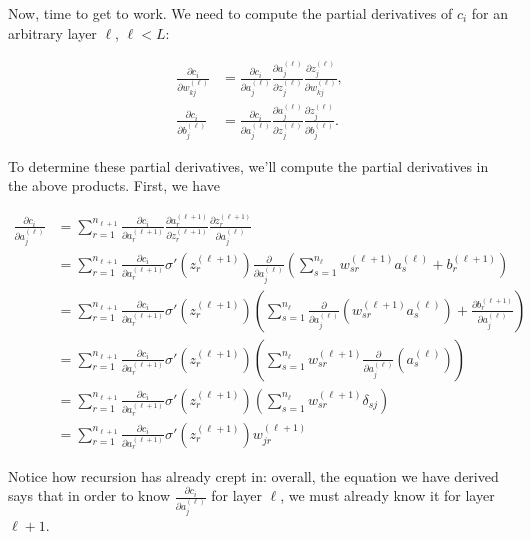\documentclass{article}
\begin{document}
	Now, time to get to work. We need to compute the partial derivatives of $c_i$ for an arbitrary layer $\ell$, $\ell < L$:
	
	\begin{align*}
		\frac{\partial c_i}{\partial w^{(\ell)}_{kj}} &= \frac{\partial c_i}{\partial a^{(\ell)}_j} \frac{\partial a^{(\ell)}_j}{\partial z^{(\ell)}_j} \frac{\partial z^{(\ell)}_j}{\partial w^{(\ell)}_{kj}}, \\
		\frac{\partial c_i}{\partial b^{(\ell)}_j} &= \frac{\partial c_i}{\partial a^{(\ell)}_j} \frac{\partial a^{(\ell)}_j}{\partial z^{(\ell)}_j} \frac{\partial z^{(\ell)}_j}{\partial b^{(\ell)}_j}.
	\end{align*}
	
	To determine these partial derivatives, we'll compute the partial derivatives in the above products. First, we have
	
	\begin{align*}
		\frac{\partial c_i}{\partial a^{(\ell)}_j} &= \sum_{r = 1}^{n_{\ell+1}} \frac{\partial c_i}{\partial a^{(\ell+1)}_r} \frac{\partial a^{(\ell+1)}_r}{\partial z^{(\ell + 1)}_r} \frac{\partial z^{(\ell + 1)}_r}{\partial a^{(\ell)}_j} \\
		&= \sum_{r = 1}^{n_{\ell+1}} \frac{\partial c_i}{\partial a^{(\ell+1)}_r} \sigma'(z^{(\ell + 1)}_r) \frac{\partial}{\partial a^{(\ell)}_j}\left(\sum_{s = 1}^{n_\ell} w^{(\ell + 1)}_{sr} a^{(\ell)}_s + b^{(\ell + 1)}_r\right) \\
		&= \sum_{r = 1}^{n_{\ell+1}} \frac{\partial c_i}{\partial a^{(\ell+1)}_r} \sigma'(z^{(\ell + 1)}_r) \left(\sum_{s = 1}^{n_\ell} \frac{\partial}{\partial a^{(\ell)}_j}\left(w^{(\ell + 1)}_{sr} a^{(\ell)}_s\right) + \frac{\partial b^{(\ell + 1)}_r}{\partial a^{(\ell)}_j}\right) \\
		&= \sum_{r = 1}^{n_{\ell+1}} \frac{\partial c_i}{\partial a^{(\ell+1)}_r} \sigma'(z^{(\ell + 1)}_r) \left(\sum_{s = 1}^{n_\ell} w^{(\ell + 1)}_{sr} \frac{\partial}{\partial a^{(\ell)}_j} \left( a^{(\ell)}_s \right) \right) \\
		&= \sum_{r = 1}^{n_{\ell+1}} \frac{\partial c_i}{\partial a^{(\ell+1)}_r} \sigma'(z^{(\ell + 1)}_r) \left(\sum_{s = 1}^{n_\ell} w^{(\ell + 1)}_{sr} \delta_{sj} \right) \\
		&= \sum_{r = 1}^{n_{\ell+1}} \frac{\partial c_i}{\partial a^{(\ell+1)}_r} \sigma'(z^{(\ell + 1)}_r) w^{(\ell + 1)}_{jr}
	\end{align*}
	
	Notice how recursion has already crept in: overall, the equation we have derived says that in order to know $\frac{\partial c_i}{\partial a^{(\ell)}_j}$ for layer $\ell$, we must already know it for layer $\ell + 1$.
	
\end{document}
